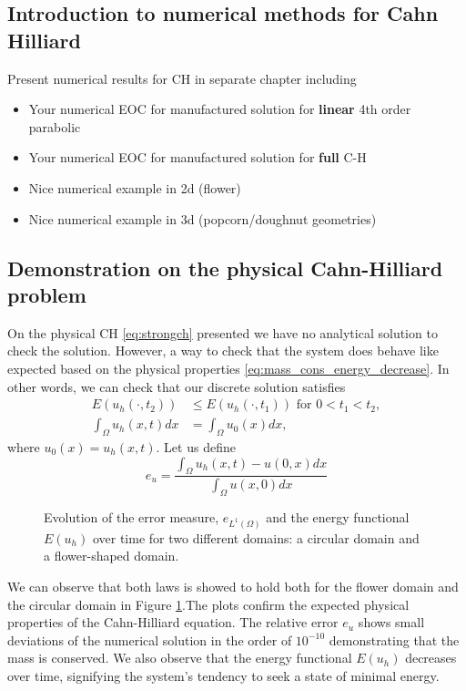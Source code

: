 \subsection{Introduction to numerical methods for Cahn Hilliard}%
\label{sub:introduction_to_numerical_methods_for_cahn_hilliard}

Present numerical results for CH in separate chapter including
\begin{itemize}
    \item Your numerical EOC for  manufactured solution for \textbf{linear} 4th order parabolic
    \item Your numerical EOC for  manufactured solution for \textbf{full} C-H
    \item Nice numerical example in 2d (flower)
    \item Nice numerical example in 3d (popcorn/doughnut geometries)
\end{itemize}


\subsection{Demonstration on the physical Cahn-Hilliard problem}%
\label{sub:demonstration_on_the_physical_cahn_hilliard}

On the physical CH \eqref{eq:strongch} presented we have no analytical solution to check the solution. However, a way to check that the system does behave like expected based on the physical properties \eqref{eq:mass_cons_energy_decrease}. In other
words, we can check that our discrete solution satisfies \[
    \begin{split}
 E( u_{h}( \cdot , t_{2}) ) & \le  E( u_{h}( \cdot , t_{1}) )   \text{ for } 0 < t_{1} < t_{2},  \\
\int_{\Omega }^{} u_{h} ( x,t)  dx & = \int_{\Omega }^{} u_{0}(x)  dx,
    \end{split}
\]
where $u_{0}( x) = u_{h}( x,t) $. Let us define
\[
 e_{u} = \frac{ \int_{\Omega }^{}  u_h(x,t)- u(0,x) dx}{ \int_{\Omega }^{}  u(x,0) dx}
\]

\begin{figure}[h!]

\caption{Evolution of the error measure, $e_{L^{1}(\Omega)}$ and the energy functional $E(u_h)$ over time for two different domains: a circular domain and a flower-shaped domain.  }
\label{fig:physical_CH_plot}
\end{figure}

We can observe that both laws is showed to hold both for the flower domain and the circular domain in Figure \ref{fig:physical_CH_plot}.The plots confirm the expected physical properties of the Cahn-Hilliard equation. The relative error $e_{u}$ shows small deviations of the numerical solution in the order of $10^{ -10 }$ demonstrating that the mass is conserved. We also observe that the energy functional
$E(u_h)$ decreases over time, signifying the system's tendency to seek a state of minimal energy.




